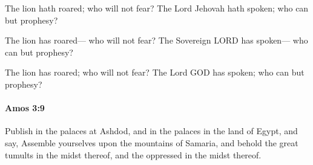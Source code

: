 			\begin{versebox}
					\item[BHS] 
					\item[LXX] 
					\item[ASV] The lion hath roared; who will not fear? The Lord Jehovah hath spoken; who can but prophesy?
					\item[NIV] The lion has roared— who will not fear? The Sovereign LORD has spoken— who can but prophesy?
					\item[NRSV] The lion has roared; who will not fear? The Lord GOD has spoken; who can but prophesy?
			\end{versebox}

		\paragraph{Amos 3:9} %
			\label{AMOS-3-9}

			Publish in the palaces at Ashdod, and in the palaces in the land of Egypt, and say, Assemble yourselves upon the mountains of Samaria, and behold the great tumults in the midst thereof, and the oppressed in the midst thereof.

